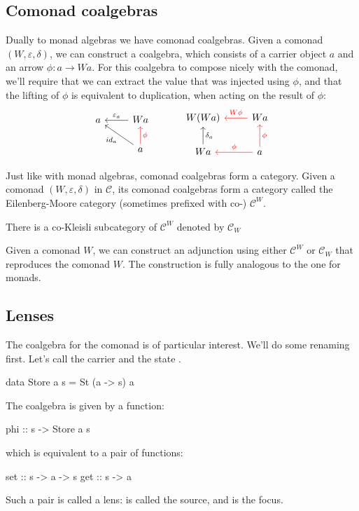\documentclass[DaoFP]{subfiles}
\begin{document}
\subsection{Comonad coalgebras}

Dually to monad algebras we have comonad coalgebras. Given a comonad $(W, \varepsilon, \delta)$, we can construct a coalgebra, which consists of a carrier object $a$ and an arrow $\phi \colon a \to W a$. For this coalgebra to compose nicely with the comonad, we'll require that we can extract the value that was injected using $\phi$, and that the lifting of $\phi$ is equivalent to duplication, when acting on the result of $\phi$:
\[
 \begin{tikzcd}
 a
 & W a
 \arrow[l, "\varepsilon_a"']
 \\
 & a
 \arrow[ul, "id_a"]
\arrow[u, red, "\phi"']
 \end{tikzcd}
  \hspace{30pt}
 \begin{tikzcd}
W(W a) 
&W a
\arrow[l, red, "W \phi "']
\\
W a
\arrow[u, "\delta_a"']
& a
\arrow[l, red, "\phi"']
\arrow[u, red, "\phi"']
 \end{tikzcd}
\]

Just like with monad algebras, comonad coalgebras form a category. Given a comonad $(W, \varepsilon, \delta)$ in $\mathcal{C}$, its comonad coalgebras form a category called the Eilenberg-Moore category (sometimes prefixed with co-) $\mathcal{C}^W$.

There is a co-Kleisli subcategory of $\mathcal{C}^W$ denoted by $\mathcal{C}_W$

Given a comonad $W$, we can construct an adjunction using either $\mathcal{C}^W$ or $\mathcal{C}_W$ that reproduces the comonad $W$. The construction is fully analogous to the one for monads.

\subsection{Lenses}

The coalgebra for the  comonad is of particular interest. We'll do some renaming first. Let's call the carrier  and the state . 
\begin{haskell}
data Store a s = St (a -> s) a
\end{haskell}
The coalgebra is given by a function:
\begin{haskell}
phi :: s -> Store a s
\end{haskell}
which is equivalent to a pair of functions:
\begin{haskell}
set :: s -> a -> s
get :: s -> a
\end{haskell}
Such a pair is called a lens:  is called the source, and  is the focus. 
\end{document}
